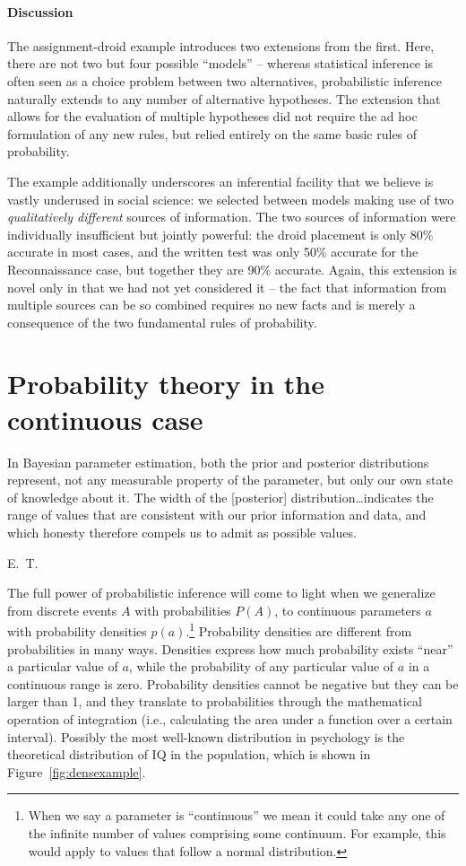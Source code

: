 \paragraph{Discussion} The assignment-droid example introduces two extensions from the first. Here, there are not two but four possible ``models'' -- whereas statistical inference is often seen as a choice problem between two alternatives, probabilistic inference naturally extends to any number of alternative hypotheses. The extension that allows for the evaluation of multiple hypotheses did not require the ad hoc formulation of any new rules, but relied entirely on the same basic rules of probability.

The example additionally underscores an inferential facility that we believe is vastly underused in social science: we selected between models making use of two \emph{qualitatively different} sources of information. The two sources of information were individually insufficient but jointly powerful: the droid placement is only 80\% accurate in most cases, and the written test was only 50\% accurate for the Reconnaissance case, but together they are 90\% accurate. Again, this extension is novel only in that we had not yet considered it -- the fact that information from multiple sources can be so combined requires no new facts and is merely a consequence of the two fundamental rules of probability.

\section*{Probability theory in the continuous case}
\epigraph{{In Bayesian parameter estimation, both the prior and posterior distributions represent, not any measurable property of the parameter, but only our own state of knowledge about it. The width of the [posterior] distribution\dots indicates the range of values that are consistent with our prior information and data, and which honesty therefore compels us to admit as possible values.}}{E.~T.~}

\noindent The full power of probabilistic inference will come to light when we generalize from discrete events $A$ with probabilities $P(A)$, to continuous parameters $a$ with probability densities $p(a)$.\footnote{When we say a parameter is ``continuous'' we mean it could take any one of the infinite number of values comprising some continuum. For example, this would apply to values that follow a normal distribution.} Probability densities are different from probabilities in many ways. Densities express how much probability exists ``near'' a particular value of $a$, while the probability of any particular value of $a$ in a continuous range is zero. Probability densities cannot be negative but they can be larger than 1, and they translate to probabilities through the mathematical operation of integration (i.e., calculating the area under a function over a certain interval). Possibly the most well-known distribution in psychology is the theoretical distribution of IQ in the population, which is shown in Figure~\ref{fig:densexample}.

